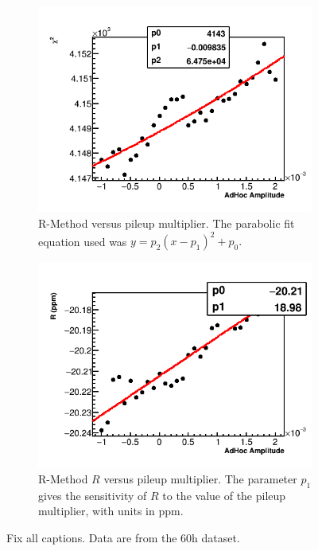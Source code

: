 \begin{figure}[h]
    \begin{subfigure}[t]{0.45\textwidth}
        \centering
        \includegraphics[width=\textwidth]{FullRatio_Chi2_Vs_AdHocAmplitude_Canv}
        \caption{R-Method \chisq versus pileup multiplier. The parabolic fit equation used was $y = p_{2}(x - p_{1})^{2} + p_{0}.$}
    \end{subfigure}%
    \hspace{1cm}
    \begin{subfigure}[t]{0.45\textwidth}
        \centering
        \includegraphics[width=\textwidth]{FullRatio_R_Vs_AdHocAmplitude_Canv}
        \caption{R-Method $R$ versus pileup multiplier. The parameter $p_{1}$ gives the sensitivity of $R$ to the value of the pileup multiplier, with units in ppm.}
    \end{subfigure}
\caption[]{Fix all captions. Data are from the 60h dataset.}
\label{fig:AdHocGainScan}
\end{figure}





